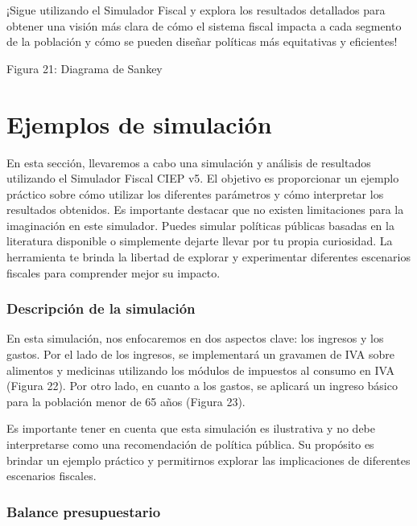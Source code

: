 ¡Sigue utilizando el Simulador Fiscal y explora los resultados
detallados para obtener una visión más clara de cómo el sistema fiscal
impacta a cada segmento de la población y cómo se pueden diseñar
políticas más equitativas y eficientes!

Figura 21: Diagrama de Sankey


\hypertarget{ejemplos-de-simulaciuxf3n}{%
\section{Ejemplos de simulación}\label{ejemplos-de-simulaciuxf3n}}

En esta sección, llevaremos a cabo una simulación y análisis de
resultados utilizando el Simulador Fiscal CIEP v5. El objetivo es
proporcionar un ejemplo práctico sobre cómo utilizar los diferentes
parámetros y cómo interpretar los resultados obtenidos. Es importante
destacar que no existen limitaciones para la imaginación en este
simulador. Puedes simular políticas públicas basadas en la literatura
disponible o simplemente dejarte llevar por tu propia curiosidad. La
herramienta te brinda la libertad de explorar y experimentar diferentes
escenarios fiscales para comprender mejor su impacto.

\hypertarget{descripciuxf3n-de-la-simulaciuxf3n}{%
\subsubsection{Descripción de la
simulación}\label{descripciuxf3n-de-la-simulaciuxf3n}}

En esta simulación, nos enfocaremos en dos aspectos clave: los ingresos
y los gastos. Por el lado de los ingresos, se implementará un gravamen
de IVA sobre alimentos y medicinas utilizando los módulos de impuestos
al consumo en IVA (Figura 22). Por otro lado, en cuanto a los gastos, se
aplicará un ingreso básico para la población menor de 65 años (Figura
23).

Es importante tener en cuenta que esta simulación es ilustrativa y no
debe interpretarse como una recomendación de política pública. Su
propósito es brindar un ejemplo práctico y permitirnos explorar las
implicaciones de diferentes escenarios fiscales.

\hypertarget{balance-presupuestario}{%
\subsubsection{Balance presupuestario}\label{balance-presupuestario}}

